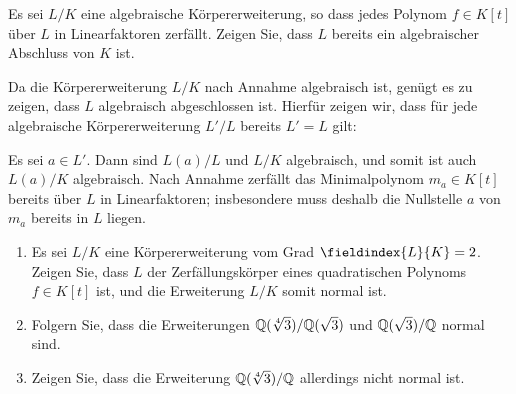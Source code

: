 \documentclass[a4paper, 10pt]{scrartcl}
\begin{document}

\begin{question}
  Es sei $L/K$ eine algebraische Körpererweiterung, so dass jedes Polynom $f \in K[t]$ über $L$ in Linearfaktoren zerfällt.
  Zeigen Sie, dass $L$ bereits ein algebraischer Abschluss von $K$ ist.
\end{question}

\begin{solution}
  Da die Körpererweiterung $L/K$ nach Annahme algebraisch ist, genügt es zu zeigen, dass $L$ algebraisch abgeschlossen ist.
  Hierfür zeigen wir, dass für jede algebraische Körpererweiterung $L'/L$ bereits $L' = L$ gilt:
  
  Es sei $a \in L'$.
  Dann sind $L(a)/L$ und $L/K$ algebraisch, und somit ist auch $L(a)/K$ algebraisch.
  Nach Annahme zerfällt das Minimalpolynom $m_a \in K[t]$ bereits über $L$ in Linearfaktoren;
  insbesondere muss deshalb die Nullstelle $a$ von $m_a$ bereits in $L$ liegen.
\end{solution}

\begin{question}
  \begin{enumerate}
    \item
      Es sei $L/K$ eine Körpererweiterung vom Grad $\fieldindex{L}{K} = 2$.
      Zeigen Sie, dass $L$ der Zerfällungskörper eines quadratischen Polynoms $f \in K[t]$ ist, und die Erweiterung $L/K$ somit normal ist.
    \item
      Folgern Sie, dass die Erweiterungen $\mathbb{Q}(\sqrt[4]{3})/\mathbb{Q}(\sqrt{3})$ und $\mathbb{Q}(\sqrt{3})/\mathbb{Q}$ normal sind.
    \item
      Zeigen Sie, dass die Erweiterung $\mathbb{Q}(\sqrt[4]{3})/\mathbb{Q}$ allerdings nicht normal ist.
  \end{enumerate}
\end{question}
\end{document}
